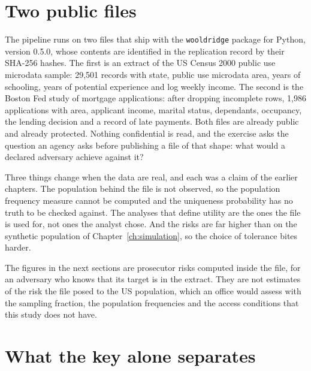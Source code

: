 \section{Two public files}

The pipeline runs on two files that ship with the \texttt{wooldridge} package for
Python, version 0.5.0, whose contents are identified in the replication record by
their SHA-256 hashes.
The first is an extract of the US Census 2000 public use microdata sample: 29,501
records with state, public use microdata area, years of schooling, years of
potential experience and log weekly income. The second is the Boston Fed study of
mortgage applications: after dropping incomplete rows, 1,986 applications with area,
applicant income, marital status, dependants, occupancy, the lending decision and a
record of late payments.
Both files are already public and already protected. Nothing confidential is read,
and the exercise asks the question an agency asks before publishing a file of that
shape: what would a declared adversary achieve against it?

Three things change when the data are real, and each was a claim of the earlier
chapters. The population behind the file is not observed, so the population
frequency measure cannot be computed and the uniqueness probability has no truth to
be checked against. The analyses that define utility are the ones the file is used
for, not ones the analyst chose. And the risks are far higher than on the synthetic
population of Chapter~\ref{ch:simulation}, so the choice of tolerance bites harder.

The figures in the next sections are prosecutor risks computed inside the file, for
an adversary who knows that its target is in the extract. They are not estimates of
the risk the file posed to the US population, which an office would assess with the
sampling fraction, the population frequencies and the access conditions that this
study does not have.

\section{What the key alone separates}\label{c12:sec-key}

